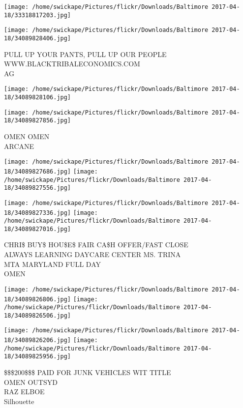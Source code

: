 \documentclass[10pt,letterpaper]{article}
\begin{document}
\texttt{[image: /home/swickape/Pictures/flickr/Downloads/Baltimore 2017-04-18/33318817203.jpg]}

\vspace{0.25in}
\texttt{[image: /home/swickape/Pictures/flickr/Downloads/Baltimore 2017-04-18/34089828406.jpg]}

PULL UP YOUR PANTS, PULL UP OUR PEOPLE WWW.BLACKTRIBALECONOMICS.COM\\
AG\\
\pagebreak

\texttt{[image: /home/swickape/Pictures/flickr/Downloads/Baltimore 2017-04-18/34089828106.jpg]}

\vspace{0.25in}
\texttt{[image: /home/swickape/Pictures/flickr/Downloads/Baltimore 2017-04-18/34089827856.jpg]}

OMEN OMEN\\
ARCANE\\
\pagebreak

\texttt{[image: /home/swickape/Pictures/flickr/Downloads/Baltimore 2017-04-18/34089827686.jpg]}
\texttt{[image: /home/swickape/Pictures/flickr/Downloads/Baltimore 2017-04-18/34089827556.jpg]}

\texttt{[image: /home/swickape/Pictures/flickr/Downloads/Baltimore 2017-04-18/34089827336.jpg]}
\texttt{[image: /home/swickape/Pictures/flickr/Downloads/Baltimore 2017-04-18/34089827016.jpg]}

CHRI\$ BUY\$ HOU\$E\$ FAIR CA\$H OFFER/FAST CLOSE\\
ALWAYS LEARNING DAYCARE CENTER MS. TRINA\\
MTA MARYLAND FULL DAY\\
OMEN\\
\pagebreak

\texttt{[image: /home/swickape/Pictures/flickr/Downloads/Baltimore 2017-04-18/34089826806.jpg]}
\texttt{[image: /home/swickape/Pictures/flickr/Downloads/Baltimore 2017-04-18/34089826506.jpg]}

\texttt{[image: /home/swickape/Pictures/flickr/Downloads/Baltimore 2017-04-18/34089826206.jpg]}
\texttt{[image: /home/swickape/Pictures/flickr/Downloads/Baltimore 2017-04-18/34089825956.jpg]}

\$\$\$200\$\$\$ PAID FOR JUNK VEHICLES WIT TITLE\\
OMEN OUTSYD\\
RAZ ELBOE\\
Silhouette\\
\pagebreak
\end{document}
